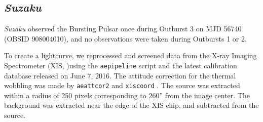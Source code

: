 \subsection{\textit{Suzaku}}
\par \textit{Suzaku} \citep{Mitsuda_Suzaku} observed the Bursting Pulsar once during Outburst 3 on MJD 56740 (OBSID 908004010), and no observations were taken during Outbursts 1 or 2.
\par To create a lightcurve, we reprocessed and screened data from the X-ray Imaging Spectrometer (XIS, \citealp{Koyama_XIS})using the \texttt{aepipeline} script and the latest calibration database released on June 7, 2016.  The attitude correction for the thermal wobbling was made by \texttt{aeattcor2} and \texttt{xiscoord} \citep{Uchiyama_SuzPSF}. The source was extracted within a radius of 250 pixels corresponding to 260'' from the image center.  The background was extracted near the edge of the XIS chip, and subtracted from the source. 

